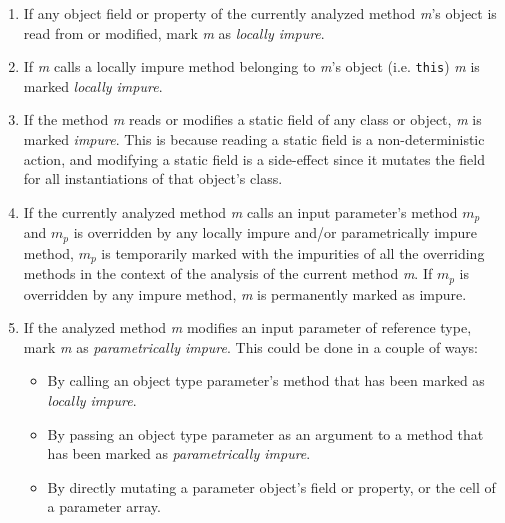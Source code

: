 \documentclass[a4paper,12pt]{article}
\begin{document}
\begin{enumerate}
  \item If any object field or property of the currently analyzed method \textit{m}'s object is read from or modified, mark \textit{m} as \textit{locally impure}. \label{itm:locally-impure}
  \item If \textit{m} calls a locally impure method belonging to \textit{m}'s object (i.e. \texttt{this}) \textit{m} is marked \textit{locally impure}.
  \item If the method \textit{m} reads or modifies a static field of any class or object, \textit{m} is marked \textit{impure}. This is because reading a static field is a non-deterministic action, and modifying a static field is a side-effect since it mutates the field for all instantiations of that object's class. \label{itm:static-impure}
  \item If the currently analyzed method \textit{m} calls an input parameter's method $m_p$ and $m_p$ is overridden by any locally impure and/or parametrically impure method, $m_p$ is temporarily marked with the impurities of all the overriding methods in the context of the analysis of the current method \textit{m}. If $m_p$ is overridden by any impure method, \textit{m} is permanently marked as impure.
  \item If the analyzed method \textit{m} modifies an input parameter of reference type, mark \textit{m} as \textit{parametrically impure}. This could be done in a couple of ways: \label{itm:parametrically-impure}
    \begin{itemize}
      \item By calling an object type parameter's method that has been marked as \textit{locally impure}.
      \item By passing an object type parameter as an argument to a method that has been marked as \textit{parametrically impure}.
      \item By directly mutating a parameter object's field or property, or the cell of a parameter array.

\end{itemize}
\end{enumerate}
\end{document}
